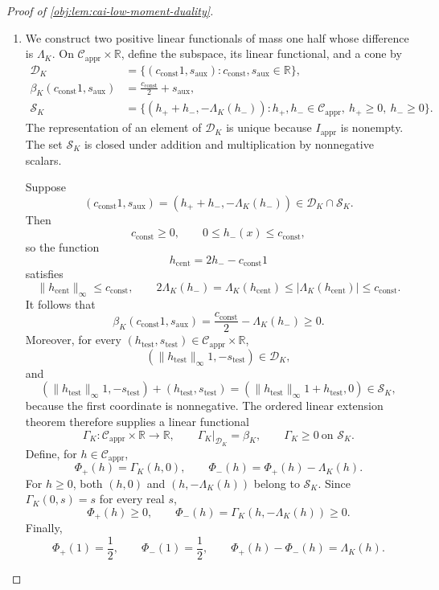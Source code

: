 \documentclass[11pt]{article}
\begin{document}
\begin{proof}[Proof of \cref{obj:lem:cai-low-moment-duality}]
\begin{enumerate}
\item We construct two positive linear functionals of mass one half whose difference is \(\Lambda_K\). On
\(\mathcal C_{\mathrm{appr}}\times\mathbb R\), define the subspace, its linear functional, and a cone by
\[
\begin{aligned}
\mathcal D_K
&=\{(c_{\mathrm{const}}1,s_{\mathrm{aux}}):
       c_{\mathrm{const}},s_{\mathrm{aux}}\in\mathbb R\},\\
\beta_K(c_{\mathrm{const}}1,s_{\mathrm{aux}})
&=\frac{c_{\mathrm{const}}}{2}+s_{\mathrm{aux}},\\
\mathcal S_K
&=\{(h_++h_-,-\Lambda_K(h_-)):
       h_+,h_-\in\mathcal C_{\mathrm{appr}},\
       h_+\ge0,\ h_-\ge0\}.
\end{aligned}
\]
The representation of an element of \(\mathcal D_K\) is unique because
\(I_{\mathrm{appr}}\) is nonempty. The set \(\mathcal S_K\) is closed under addition and multiplication by nonnegative scalars.

Suppose
\[
(c_{\mathrm{const}}1,s_{\mathrm{aux}})
=(h_++h_-,-\Lambda_K(h_-))\in\mathcal D_K\cap\mathcal S_K.
\]
Then
\[
c_{\mathrm{const}}\ge0,\qquad
0\le h_-(x)\le c_{\mathrm{const}},
\]
so the function
\[
h_{\mathrm{cent}}=2h_--c_{\mathrm{const}}1
\]
satisfies
\[
\|h_{\mathrm{cent}}\|_\infty\le c_{\mathrm{const}},\qquad
2\Lambda_K(h_-)
=\Lambda_K(h_{\mathrm{cent}})
\le|\Lambda_K(h_{\mathrm{cent}})|
\le c_{\mathrm{const}}.
\]
It follows that
\[
\beta_K(c_{\mathrm{const}}1,s_{\mathrm{aux}})
=\frac{c_{\mathrm{const}}}{2}-\Lambda_K(h_-)\ge0.
\]
Moreover, for every
\((h_{\mathrm{test}},s_{\mathrm{test}})
\in\mathcal C_{\mathrm{appr}}\times\mathbb R\),
\[
(\|h_{\mathrm{test}}\|_\infty1,-s_{\mathrm{test}})
\in\mathcal D_K,
\]
and
\[
(\|h_{\mathrm{test}}\|_\infty1,-s_{\mathrm{test}})
+(h_{\mathrm{test}},s_{\mathrm{test}})
=(\|h_{\mathrm{test}}\|_\infty1+h_{\mathrm{test}},0)
\in\mathcal S_K,
\]
because the first coordinate is nonnegative. The ordered linear extension theorem therefore supplies a linear functional
\[
\Gamma_K:\mathcal C_{\mathrm{appr}}\times\mathbb R\longrightarrow\mathbb R,
\qquad
\Gamma_K|_{\mathcal D_K}=\beta_K,\qquad
\Gamma_K\ge0\ \text{on }\mathcal S_K.
\]
Define, for \(h\in\mathcal C_{\mathrm{appr}}\),
\[
\Phi_+(h)=\Gamma_K(h,0),\qquad
\Phi_-(h)=\Phi_+(h)-\Lambda_K(h).
\]
For \(h\ge0\), both \((h,0)\) and \((h,-\Lambda_K(h))\) belong to \(\mathcal S_K\). Since \(\Gamma_K(0,s)=s\) for every real \(s\),
\[
\Phi_+(h)\ge0,\qquad
\Phi_-(h)=\Gamma_K(h,-\Lambda_K(h))\ge0.
\]
Finally,
\[
\Phi_+(1)=\frac12,\qquad
\Phi_-(1)=\frac12,\qquad
\Phi_+(h)-\Phi_-(h)=\Lambda_K(h).
\]


\end{enumerate}
\end{proof}
\end{document}
